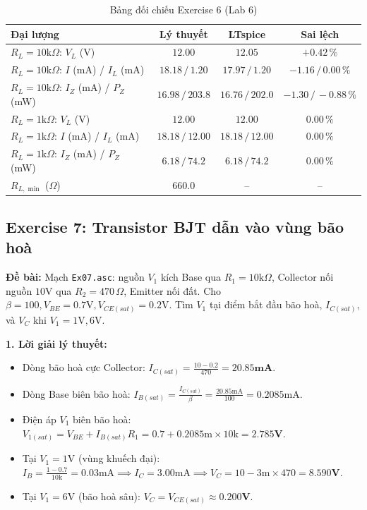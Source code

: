 \documentclass[11pt,a4paper]{article}
\newcommand{\cmd}[1]{\texttt{#1}}
\begin{document}
\begin{table}[H]\centering\small
\caption{Bảng đối chiếu Exercise 6 (Lab 6)}
\begin{tabular}{|l|c|c|c|}
\hline
\textbf{Đại lượng} & \textbf{Lý thuyết} & \textbf{LTspice} & \textbf{Sai lệch} \\ \hline
$R_L=10\text{k}\Omega$: $V_L$ (V) & $12.00$ & $12.05$ & $+0.42\,\%$ \\ \hline
$R_L=10\text{k}\Omega$: $I$ (mA) / $I_L$ (mA) & $18.18\,/\,1.20$ & $17.97\,/\,1.20$ & $-1.16\,/\,0.00\,\%$ \\ \hline
$R_L=10\text{k}\Omega$: $I_Z$ (mA) / $P_Z$ (mW) & $16.98\,/\,203.8$ & $16.76\,/\,202.0$ & $-1.30\,/\,-0.88\,\%$ \\ \hline
$R_L=1\text{k}\Omega$: $V_L$ (V) & $12.00$ & $12.00$ & $0.00\,\%$ \\ \hline
$R_L=1\text{k}\Omega$: $I$ (mA) / $I_L$ (mA) & $18.18\,/\,12.00$ & $18.18\,/\,12.00$ & $0.00\,\%$ \\ \hline
$R_L=1\text{k}\Omega$: $I_Z$ (mA) / $P_Z$ (mW) & $6.18\,/\,74.2$ & $6.18\,/\,74.2$ & $0.00\,\%$ \\ \hline
$R_{L,\min}$ ($\Omega$) & $660.0$ & -- & -- \\ \hline
\end{tabular}
\end{table}

\subsection{Exercise 7: Transistor BJT dẫn vào vùng bão hoà}
\textbf{Đề bài:} Mạch \cmd{Ex07.asc}: nguồn $V_1$ kích Base qua $R_1=10\text{k}\Omega$, Collector nối nguồn $10\text{V}$ qua $R_2=470\,\Omega$, Emitter nối đất. Cho $\beta=100, V_{BE}=0.7\text{V}, V_{CE(sat)}=0.2\text{V}$. Tìm $V_1$ tại điểm bắt đầu bão hoà, $I_{C(sat)}$, và $V_C$ khi $V_1=1\text{V}, 6\text{V}$.

\textbf{1. Lời giải lý thuyết:}
\begin{itemize}[itemsep=1pt]
  \item Dòng bão hoà cực Collector: $I_{C(sat)} = \frac{10 - 0.2}{470} = \mathbf{20.85\text{mA}}$.
  \item Dòng Base biên bão hoà: $I_{B(sat)} = \frac{I_{C(sat)}}{\beta} = \frac{20.85\text{mA}}{100} = 0.2085\text{mA}$.
  \item Điện áp $V_1$ biên bão hoà: $V_{1(sat)} = V_{BE} + I_{B(sat)} R_1 = 0.7 + 0.2085\text{m} \times 10\text{k} = \mathbf{2.785\text{V}}$.
  \item Tại $V_1=1\text{V}$ (vùng khuếch đại): $I_B = \frac{1 - 0.7}{10\text{k}} = 0.03\text{mA} \implies I_C = 3.00\text{mA} \implies V_C = 10 - 3\text{m}\times 470 = \mathbf{8.590\text{V}}$.
  \item Tại $V_1=6\text{V}$ (bão hoà sâu): $V_C = V_{CE(sat)} \approx \mathbf{0.200\text{V}}$.
\end{itemize}
\end{document}
